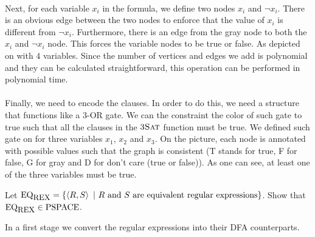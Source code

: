 \documentclass{article}
\begin{document}
\begin{exercise}
\begin{answer}
\paragraph{}
Next, for each variable $x_i$ in the  formula, we define two nodes $x_i$ and $\neg x_i$. There is an obvious edge between the two nodes to enforce that the value of $x_i$ is different from $\neg x_i$. Furthermore, there is an edge from the gray node to both the $x_i$ and $\neg x_i$ node. This forces the variable nodes to be true or false. As depicted on  with $4$ variables. Since the number of vertices and edges we add is polynomial and they can be calculated straightforward, this operation can be performed in polynomial time.
\paragraph{}
Finally, we need to encode the clauses. In order to do this, we need a structure that functions like a 3-OR gate. We can the constraint the color of such gate to true such that all the clauses in the $\mbox{\textsc{3Sat}}$ function must be true. We defined such gate on  for three variables $x_1$, $x_2$ and $x_3$. On the picture, each node is annotated with possible values such that the graph is consistent (T stands for true, F for false, G for gray and D for don't care (true or false)). As one can see, at least one of the three variables must be true.
\end{answer}
\end{exercise}
\begin{exercise}
Let $\mbox{EQ}_{\mbox{\small{REX}}}=\left\{ \left\langle R,S \right\rangle\ |\ \mbox{$R$ and $S$ are equivalent regular expressions} \right\}$. Show that $\mbox{EQ}_{\mbox{\small{REX}}}\in\mbox{PSPACE}$.
\begin{answer}
In a first stage we convert the regular expressions into their DFA counterparts. 
\end{answer}
\end{exercise}
\end{document}
